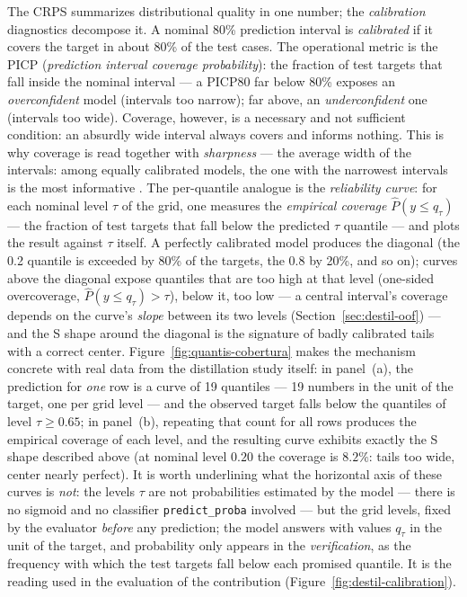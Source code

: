 The CRPS summarizes distributional quality in one number; the
\emph{calibration} diagnostics decompose it. A nominal 80\%
prediction interval is \emph{calibrated} if it covers the target in
about 80\% of the test cases. The operational metric is the PICP
(\emph{prediction interval coverage probability}): the fraction of
test targets that fall inside the nominal interval --- a PICP80 far
below 80\% exposes an \emph{overconfident} model (intervals too
narrow); far above, an \emph{underconfident} one (intervals too
wide). Coverage, however, is a necessary and not sufficient
condition: an absurdly wide interval always covers and informs
nothing. This is why coverage is read together with
\emph{sharpness} --- the average width of the intervals: among
equally calibrated models, the one with the narrowest intervals is
the most informative \citep{gneiting2007calib}. The per-quantile
analogue is the \emph{reliability curve}: for each nominal level
$\tau$ of the grid, one measures the \emph{empirical coverage}
$\hat P(y \leq q_\tau)$ --- the fraction of test targets that fall
below the predicted $\tau$ quantile --- and plots the result against
$\tau$ itself. A perfectly calibrated model produces the diagonal
(the 0.2 quantile is exceeded by 80\% of the targets, the 0.8 by
20\%, and so on); curves above the diagonal expose quantiles that
are too high at that level (one-sided overcoverage,
$\hat P(y\le q_\tau)>\tau$), below it, too low --- a central
interval's coverage depends on the curve's \emph{slope} between its
two levels (Section~\ref{sec:destil-oof}) --- and the S shape
around the diagonal is the signature of badly calibrated tails with
a correct center. Figure~\ref{fig:quantis-cobertura} makes the
mechanism concrete with real data from the distillation study
itself: in panel~(a), the prediction for \emph{one} row is a curve
of 19 quantiles --- 19 numbers in the unit of the target, one per
grid level --- and the observed target falls below the quantiles of
level $\tau \geq 0.65$; in panel~(b), repeating that count for all
rows produces the empirical coverage of each level, and the
resulting curve exhibits exactly the S shape described above (at
nominal level $0.20$ the coverage is $8.2\%$: tails too wide,
center nearly perfect). It is worth underlining what the horizontal
axis of these curves is \emph{not}: the levels $\tau$ are not
probabilities estimated by the model --- there is no sigmoid and no
classifier \texttt{predict\_proba} involved --- but the grid
levels, fixed by the evaluator \emph{before} any prediction; the
model answers with values $q_\tau$ in the unit of the target, and
probability only appears in the \emph{verification}, as the
frequency with which the test targets fall below each promised
quantile. It is the reading used in the evaluation of the
contribution (Figure~\ref{fig:destil-calibration}).

